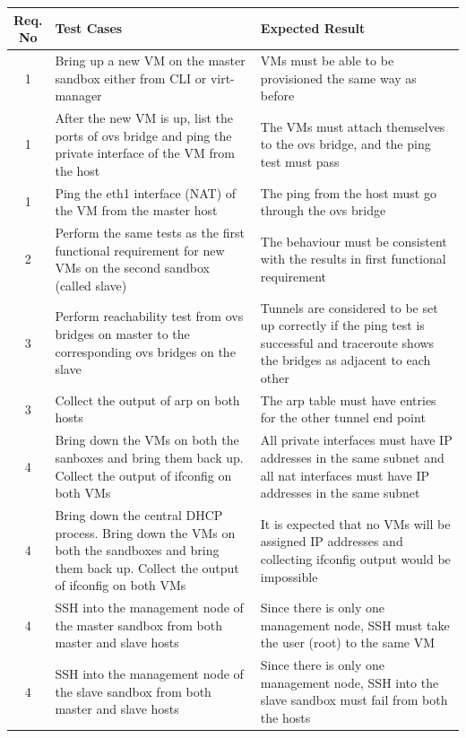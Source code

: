 \documentclass[12pt]{extarticle}
\begin{document}
\begin{center}


\begin{table}[H]
\begin{tabular}{||c  | p{0.5\linewidth} | p{0.5\linewidth} ||}
     \hline
     Req. No & Test Cases & Expected Result  \\
     \hline \hline
     1 & Bring up a new VM on the master sandbox either from CLI or virt-manager & VMs must be able to be provisioned the same way as before\\
     \hline
     1 & After the new VM is up, list the ports of ovs bridge and ping the private interface of the VM from the host & The VMs must attach themselves to the ovs bridge, and the ping test must pass \\
     \hline
     1 & Ping the eth1 interface (NAT) of the VM from the master host & The ping from the host must go through the ovs bridge \\
     \hline
     2 & Perform the same tests as the first functional requirement for new VMs on the second sandbox (called slave) & The behaviour must be consistent with the results in first functional requirement \\
     \hline
     3 & Perform reachability test from ovs bridges on master to the corresponding ovs bridges on the slave & Tunnels are considered to be set up correctly if the ping test is successful and traceroute shows the bridges as adjacent to each other \\
     \hline
     3 & Collect the output of arp on both hosts & The arp table must have entries for the other tunnel end point \\
    
     \hline
     4 & Bring down the VMs on both the sanboxes and bring them back up. Collect the output of ifconfig on both VMs & All private interfaces must have IP addresses in the same subnet and all nat interfaces must have IP addresses in the same subnet \\
     \hline
     4 & Bring down the central DHCP process. Bring down the VMs on both the sandboxes and bring them back up. Collect the output of ifconfig on both VMs & It is expected that no VMs will be assigned IP addresses and collecting ifconfig output would be impossible \\
     \hline
     4 & SSH into the management node of the master sandbox from both master and slave hosts & Since there is only one management node, SSH must take the user (root) to the same VM \\
     \hline
     4 & SSH into the management node of the slave sandbox from both master and slave hosts & Since there is only one management node, SSH into the slave sandbox must fail from both the hosts \\
     \hline 
     \end{tabular}
     \end{table}
     

\end{center}
\end{document}
